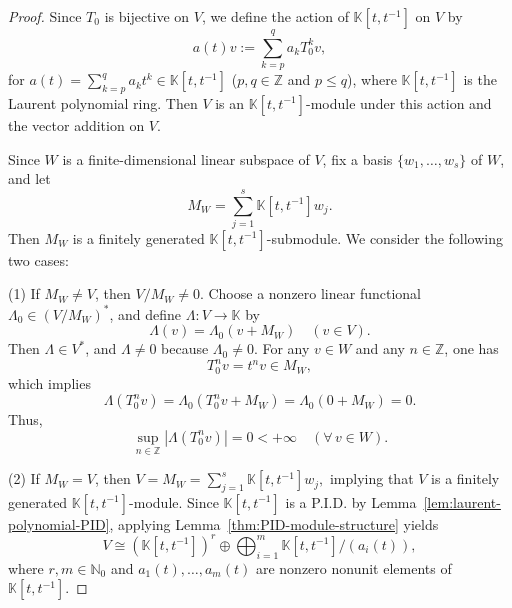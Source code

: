 \documentclass[11pt]{amsart}
\theoremstyle{definition}
\theoremstyle{remark}
\theoremstyle{plain}
\begin{document}
\begin{proof}
Since \(T_0\) is bijective on $V$,
we define the action of \(\mathbb{K}[t,t^{-1}]\) on \(V\) by
\[
a(t)v:=\sum_{k=p}^{q} a_k T_0^k v,
\]
for \(a(t)=\sum_{k=p}^{q}a_k t^k\in \mathbb{K}[t,t^{-1}]\)
(\(p,q\in\mathbb{Z}\) and \(p\le q\)), where $\mathbb{K}[t, t^{-1}]$
is the Laurent polynomial ring.  Then \(V\) is an
\(\mathbb{K}[t,t^{-1}]\)-module under this action and the vector addition on \(V\).

Since
\(W\) is a finite-dimensional linear subspace of
\(V\), fix a basis \(\{w_1,\ldots,w_s\}\)
of \(W\), and let
\[
M_W = \sum_{j=1}^s\mathbb{K}[t,t^{-1}]w_j.
\]
Then $M_{W}$ is a finitely generated
\(\mathbb{K}[t, t^{-1}]\)-submodule.
We consider the following two cases:

(1)
If \(M_W\ne V\), then \(V/M_W\ne0\).
Choose a nonzero linear functional
\(\Lambda_0\in (V/M_W)^*\), and define
\(\Lambda: V\to\mathbb{K}\) by
\[
\Lambda(v)
= \Lambda_0(v+M_W)
\quad (v\in V).
\]
Then \(\Lambda\in V^*\), and
$\Lambda\neq 0$ because $\Lambda_0\neq 0$.
For any \(v\in W\) and any \(n\in\mathbb{Z}\), one has
\[
T_0^n v=t^n v\in M_W,
\]
which implies
\[
\Lambda(T_0^n v)
= \Lambda_0(T_0^n v+M_W)
= \Lambda_0(0+M_W)
= 0.
\]
Thus,
\[
\sup_{n\in\mathbb{Z}}
|\Lambda(T_0^n v)|
= 0 < +\infty
\quad (\forall\,v\in W).
\]

\medskip

(2)
If \(M_W=V\), then \(V=M_W=\sum_{j=1}^s\mathbb{K}[t,t^{-1}]w_j,\)
implying that \(V\) is a finitely generated
\(\mathbb{K}[t,t^{-1}]\)-module.
Since \(\mathbb{K}[t,t^{-1}]\) is a P.I.D. by
Lemma~\ref{lem:laurent-polynomial-PID}, applying
Lemma~\ref{thm:PID-module-structure} yields
\[
V \cong
(\mathbb{K}[t,t^{-1}])^{r}
\oplus \bigoplus_{i=1}^{m}\mathbb{K}[t,t^{-1}]\big/(a_i(t)),
\]
where
\(r, m\in\mathbb{N}_0\)
and
\(a_1(t),\ldots,a_m(t)\) are nonzero nonunit
elements of \(\mathbb{K}[t,t^{-1}]\).

\medskip


\end{proof}
\end{document}
